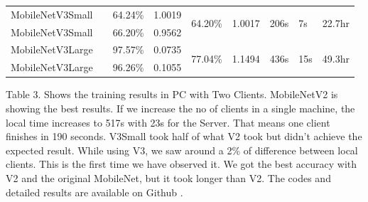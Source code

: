 \documentclass[conference]{IEEEtran}
\begin{document}
\begin{table}[htp]
\begin{adjustbox}{max width=9cm}
\begin{tabular}{|l|l|l|l|l|l|l|l|l|}
MobileNetV3Small &                            & 64.24\%                                                     & 1.0019                                                & \multirow{2}{*}{64.20\%}                                    & \multirow{2}{*}{1.0017}                                & \multirow{2}{*}{206s}                                          & \multirow{2}{*}{7s}                                             & \multirow{2}{*}{22.7hr}                               \\ \cline{1-1} \cline{3-4}
MobileNetV3Small &                            & 66.20\%                                                    & 0.9562                                                 &                                                           &                                                        &                                                                &                                                                 &                                                       \\ \cline{1-1} \cline{3-9} 
MobileNetV3Large &                            & 97.57\%                                                     & 0.0735                                                 & \multirow{2}{*}{77.04\%}                                    & \multirow{2}{*}{1.1494}                                & \multirow{2}{*}{436s}                                          & \multirow{2}{*}{15s}                                            & \multirow{2}{*}{49.3hr}                               \\ \cline{1-1} \cline{3-4}
MobileNetV3Large &                            & 96.26\%                                                     & 0.1055                                                 &                                                           &                                                        &                                                                &                                                                 &                                                       \\ \hline
\end{tabular}
\end{adjustbox}
\end{table}

Table 3. Shows the training results in PC with Two Clients.  MobileNetV2 is showing the best results. If we increase the no of clients in a single machine, the local time increases to 517s with 23s for the Server. That means one client finishes in 190 seconds. V3Small took half of what V2 took but didn't achieve the expected result. While using V3, we saw around a 2\% of difference between local clients. This is the first time we have observed it. We got the best accuracy with V2 and the original MobileNet, but it took longer than V2. The codes and detailed results are available on Github \cite{github}.
\end{document}
